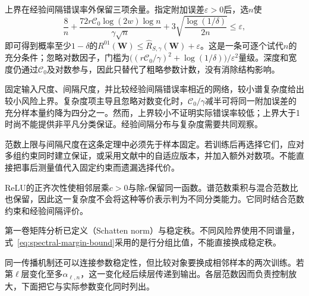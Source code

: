 上界在经验间隔错误率外保留三项余量。指定附加误差$\varepsilon>0$后，选$n$使
\[
 \frac8n+\frac{72r\mathcal C_0\log(2w)\log n}{\gamma\sqrt n}
 +3\sqrt{\frac{\log(1/\delta)}{2n}}\leq\varepsilon,
\]
即可得到概率至少$1-\delta$的$R^{01}(\bm W)\leq\hat R_{S,\gamma}(\bm W)+\varepsilon$。这是一条可逐个试代$n$的充分条件；忽略对数因子，门槛为$\bigl((r\mathcal C_0/\gamma)^2+\log(1/\delta)\bigr)/\varepsilon^2$量级。深度和宽度仍通过$\mathcal C_0$及对数参与，因此只替代了粗略参数计数，没有消除结构影响。

固定输入尺度、间隔尺度，并比较经验间隔错误率相近的网络，较小谱复杂度给出较小风险上界。复杂度项主导且忽略对数变化时，$\mathcal C_0/\gamma$减半可将同一附加误差的充分样本量约降为四分之一。然而，上界较小不证明实际错误率较低；上界大于1时尚不能提供非平凡分类保证。经验间隔分布与复杂度需要共同观察。

范数上限与间隔尺度在这条定理中必须先于样本固定。若训练后再选择它们，应对多组约束同时建立保证，或采用文献中的自适应版本，并加入额外对数项。不能直接把事后测量值代入固定约束而遗漏选择代价。

ReLU的正齐次性使相邻层乘$c>0$与除$c$保留同一函数。谱范数乘积与混合范数比也保留，因此这一复杂度不会将这种等价表示判为不同分类能力。它同时结合范数约束和经验间隔评价。

第一卷矩阵分析已定义（Schatten norm）与稳定秩。不同风险界使用不同谱量，式~\eqref{eq:spectral-margin-bound}采用的是行分组比值，不能直接换成稳定秩。

同一传播机制还可以连接参数稳定性，但比较对象要换成相邻样本的两次训练。若第$\ell$层变化至多$\alpha_{\ell,n}$，这一变化经后续层传递到输出。各层范数因而负责控制放大，下面把它与实际参数变化同时列出。

